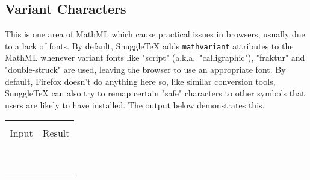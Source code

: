 \subsection*{Variant Characters}

This is one area of MathML which cause practical issues in browsers, usually due to a lack
of fonts. By default, SnuggleTeX adds \texttt{mathvariant} attributes to the MathML whenever
variant fonts like "script" (a.k.a.\ "calligraphic"), "fraktur" and "double-struck" are used,
leaving the browser to use an appropriate font. By default, Firefox doesn't do anything here
so, like similar conversion tools, SnuggleTeX can also try to remap certain "safe" characters
to other symbols that users are likely to have installed. The output below demonstrates this.

\newcommand{\vcdemo}[1]{\minout{#1{abcdefghijklmnopqrstuvwxyz}} \\ }
\newcommand{\vcudemo}[1]{\minout{#1{ABCDEFGHIJKLMNOPQRSTUVWXYZ}} \\ }
\newenvironment{vctable}
{\begin{center}
 \begin{tabular}{|r|l|}
 \hline \\
 Input & Result \\
 \hline \\
}{\hline
 \end{tabular}
 \end{center}
}
\begin{vctable}
\vcdemo{\mathcal}
\vcudemo{\mathcal}
\vcdemo{\mathsc}
\vcudemo{\mathsc}
\vcdemo{\mathbb}
\vcudemo{\mathbb}
\vcdemo{\mathfrak}
\vcudemo{\mathfrak}
\end{vctable}

